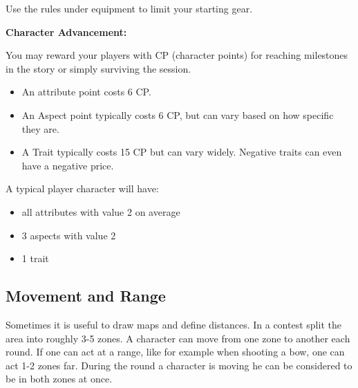 \documentclass[11pt]{article}
\begin{document}
{\begin{short}
Use the rules under equipment to limit your starting gear.

\textbf{Character Advancement:}

You may reward your players with CP (character points) for reaching milestones in the story or simply surviving the session.

\begin{itemize}
\item An attribute point costs 6 CP.
\item An Aspect point typically costs 6 CP, but can vary based on how specific they are.
\item A Trait typically costs 15 CP but can vary widely. Negative traits can even have a negative price.
\end{itemize}

A typical player character will have:
\begin{itemize}
\item all attributes with value 2 on average
\item 3 aspects with value 2
\item 1 trait
\end{itemize}
\end{short}
\subsection{Movement and Range}
\label{sec:org0c7b9da}
\begin{short}
Sometimes it is useful to draw maps and define distances. In a contest split the area into roughly 3-5 zones. A character can move from one zone to another each round. If one can act at a range, like for example when shooting a bow, one can act 1-2 zones far. During the round a character is moving he can be considered to be in both zones at once.
\end{short}
}
\end{document}
